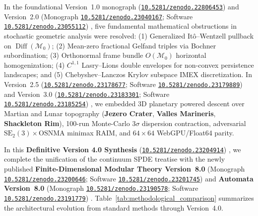\documentclass[11pt,a4paper,reqno]{article}
\newcommand{\zenodo}[1]{\mbox{\href{https://doi.org/10.5281/zenodo.#1}{\texttt{10.5281/zenodo.#1}}}}
\theoremstyle{plain}
\theoremstyle{definition}
\theoremstyle{remark}
\numberwithin{equation}{section}
\begin{document}
In the foundational Version~1.0 monograph (\zenodo{22806453}) \cite{ghulame2026spde_v1} and Version~2.0 (Monograph \zenodo{23040167}; Software \zenodo{23055112}) \cite{ananda2026stochastic_fluid_v2, ananda2026stochastic_fluid_v2_software}, five fundamental mathematical obstructions in stochastic geometric analysis were resolved: (1) Generalized It\^o--Wentzell pullback on $\operatorname{Diff}(\mathcal{M}_0)$; (2) Mean-zero fractional Gelfand triples via Bochner subordination; (3) Orthonormal frame bundle $O(\mathcal{M}_0)$ horizontal homogenization; (4) $C^{1,1}$ Lasry--Lions double envelopes for non-convex persistence landscapes; and (5) Chebyshev--Lanczos Krylov subspace IMEX discretization. In Version~2.5 (\zenodo{23178677}; Software \zenodo{23179889}) \cite{ananda2026spde_v25} and Version~3.0 (\zenodo{23183301}; Software \zenodo{23185254}) \cite{ananda2026spde_v30}, we embedded 3D planetary powered descent over Martian and Lunar topography (\textbf{Jezero Crater}, \textbf{Valles Marineris}, \textbf{Shackleton Rim}), 100-run Monte-Carlo $3\sigma$ dispersion contraction, adversarial $\mathrm{SE}_2(3)\times\mathrm{OSNMA}$ minimax RAIM, and $64\times 64$ WebGPU/Float64 parity.

In this \textbf{Definitive Version 4.0 Synthesis} (\zenodo{23204914}) \cite{ananda2026spde_v40}, we complete the unification of the continuum SPDE treatise with the newly published \textbf{Finite-Dimensional Modular Theory Version~8.0} (Monograph \zenodo{23200646}; Software \zenodo{23201745}) \cite{ananda2026finite_v80} and \textbf{Automata Version~8.0} (Monograph \zenodo{23190578}; Software \zenodo{23191779}) \cite{ananda2026automata_v80}. Table~\ref{tab:methodological_comparison} summarizes the architectural evolution from standard methods through Version~4.0.
\end{document}
